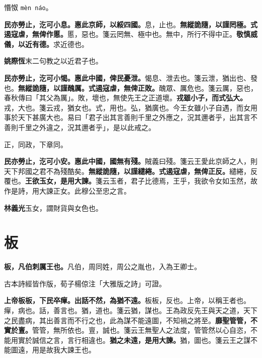 \begin{quoting}惽怓 \texttt{mèn náo}。\end{quoting}

\textbf{民亦勞止，汔可小息。惠此京師，以綏四國。}{\footnotesize 息，止也。}\textbf{無縱詭隨，以謹罔極。式遏寇虐，無俾作慝。}{\footnotesize 慝，惡也。箋云罔無、極中也。無中，所行不得中正。}\textbf{敬慎威儀，以近有德。}{\footnotesize 求近德也。}

\begin{quoting}\textbf{姚際恆}末二句教之以近君子也。\end{quoting}

\textbf{民亦勞止，汔可小愒。惠此中國，俾民憂泄。}{\footnotesize 愒息、泄去也。箋云泄，猶出也、發也。}\textbf{無縱詭隨，以謹醜厲。式遏寇虐，無俾正敗。}{\footnotesize 醜眾、厲危也。箋云厲，惡也，春秋傳曰「其父為厲」。敗，壞也，無使先王之正道壞。}\textbf{戎雖小子，而式弘大。}{\footnotesize 戎，大也。箋云戎，猶女也。式，用也。弘，猶廣也。今王女雖小子自遇，而女用事於天下甚廣大也。易曰「君子出其言善則千里之外應之，況其邇者乎，出其言不善則千里之外違之，況其邇者乎」，是以此戒之。}

\begin{quoting}正，同政，下章同。\end{quoting}

\textbf{民亦勞止，汔可小安。惠此中國，國無有殘。}{\footnotesize 賊義曰殘。箋云王愛此京師之人，則天下邦國之君不為殘酷矣。}\textbf{無縱詭隨，以謹繾綣。式遏寇虐，無俾正反。}{\footnotesize 繾綣，反覆也。}\textbf{王欲玉女，是用大諫。}{\footnotesize 箋云玉者，君子比德焉，王乎，我欲令女如玉然，故作是詩，用大諫正女。此穆公至忠之言。}

\begin{quoting}\textbf{林義光}玉女，謂財貨與女色也。\end{quoting}

\section{板}


\textbf{板，凡伯刺厲王也。}{\footnotesize 凡伯，周同姓，周公之胤也，入為王卿士。}

\begin{quoting}古本詩經皆作版，荀子楊倞注「大雅版之詩」可證。\end{quoting}

\textbf{上帝板板，下民卒癉。出話不然，為猶不遠。}{\footnotesize 板板，反也。上帝，以稱王者也。癉，病也。話，善言也。猶，道也。箋云猶，謀也。王為政反先王與天之道，天下之民盡病，其出善言而不行之也，此為謀不能遠圖，不知禍之將至。}\textbf{靡聖管管，不實於亶。}{\footnotesize 管管，無所依也。亶，誠也。箋云王無聖人之法度，管管然以心自恣，不能用實於誠信之言，言行相違也。}\textbf{猶之未遠，是用大諫。}{\footnotesize 猶，圖也。箋云王之謀不能圖遠，用是故我大諫王也。}

